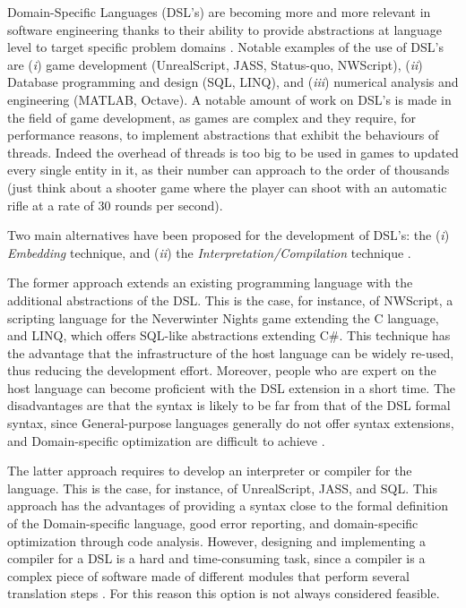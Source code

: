 Domain-Specific Languages (DSL's) are becoming more and more relevant in software engineering thanks to their ability to provide abstractions at language level to target specific problem domains \cite{van2000domain, voelter2013dsl}. Notable examples of the use of DSL's are (\textit{i}) game development (UnrealScript, JASS, Status-quo, NWScript), (\textit{ii}) Database programming and design (SQL, LINQ), and (\textit{iii}) numerical analysis and engineering (MATLAB, Octave). A notable amount of work on DSL's is made in the field of game development, as games are complex and they require, for performance reasons, to implement abstractions that exhibit the behaviours of threads. Indeed the overhead of threads is too big to be used in games to updated every single entity in it, as their number can approach to the order of thousands (just think about a shooter game where the player can shoot with an automatic rifle at a rate of 30 rounds per second).

Two main alternatives have been proposed for the development of DSL's: the (\textit{i}) \textit{Embedding} technique, and (\textit{ii}) the \textit{Interpretation/Compilation} technique \cite{mernik2005and}. 

The former approach extends an existing programming language with the additional abstractions of the DSL. This is the case, for instance, of NWScript, a scripting language for the Neverwinter Nights game extending the C language, and LINQ, which offers SQL-like abstractions extending C\#. This technique has the advantage that the infrastructure of the host language can be widely re-used, thus reducing the development effort. Moreover, people who are expert on the host language can become proficient with the DSL extension in a short time. The disadvantages are that the syntax is likely to be far from that of the DSL formal syntax, since General-purpose languages generally do not offer syntax extensions, and Domain-specific optimization are difficult to achieve \cite{kamin1998research, sloane2002post}.

The latter approach requires to develop an interpreter or compiler for the language. This is the case, for instance, of UnrealScript, JASS, and SQL. This approach has the advantages of providing a syntax close to the formal definition of the Domain-specific language, good error reporting, and domain-specific optimization through code analysis. However, designing and implementing a compiler for a DSL is a hard and time-consuming task, since a compiler is a complex piece of software made of different modules that perform several translation steps \cite{aho1986compilers}. For this reason this option is not always considered feasible.

